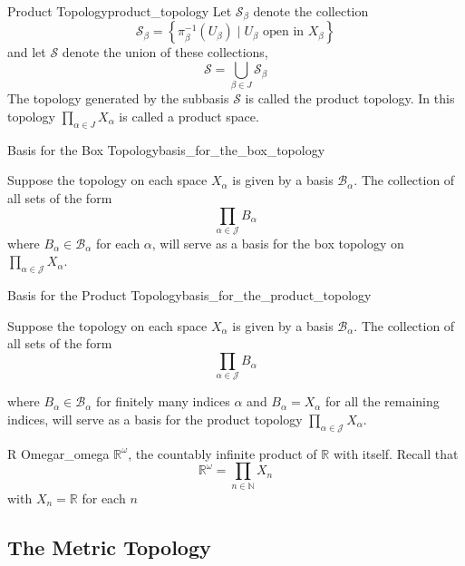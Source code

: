 \begin{definition}{Product Topology}{product_topology}
    Let $\mathcal{S}_{\beta}$ denote the collection
    \[
    \mathcal{ S } _{\beta}=\left\{\pi_{\beta}^{-1}\left(U_{\beta}\right) \mid U_{\beta} \text { open in } X_{\beta}\right\}
    \]
    and let $\mathcal{ S } $ denote the union of these collections,
    \[
    \mathcal{S}=\bigcup_{\beta \in J} \mathcal{S}_{\beta}
    \]
    The topology generated by the subbasis $\mathcal{ S } $ is called the product topology. In this topology $\prod_{\alpha \in J} X_{\alpha}$ is called a product space.
\end{definition}




\begin{theorem}{Basis for the Box Topology}{basis_for_the_box_topology}

Suppose the topology on each space $X_{\alpha}$ is given by a basis $\mathcal{B}_{\alpha}$. The collection of all sets of the form
\[
\prod_{\alpha \in \mathcal{ J } } B_{\alpha}
\]
where $B_{\alpha} \in \mathcal{B}_{\alpha}$ for each $\alpha$, will serve as a basis for the box topology on $\prod_{\alpha \in \mathcal{ J } } X_{\alpha}$.
\end{theorem}

\begin{theorem}{Basis for the Product Topology}{basis_for_the_product_topology}

Suppose the topology on each space $X_{\alpha}$ is given by a basis $\mathcal{B}_{\alpha}$. The collection of all sets of the form
\[
\prod_{\alpha \in \mathcal{ J } } B_{\alpha}
\]

where $B_{\alpha} \in \mathcal{ B } _{\alpha}$ for finitely many indices $\alpha$ and $B_{\alpha}=X_{\alpha}$ for all the remaining indices, will serve as a basis for the product topology $\prod_{\alpha \in \mathcal{ J } } X_{\alpha}$.
\end{theorem}

\begin{definition}{R Omega}{r_omega}
$\mathbb{R}^{\omega}$, the countably infinite product of $\mathbb{R}$ with itself. Recall that
\[
    \mathbb{R}^{\omega}=\prod_{n \in \mathbb{N}} X_{n}
\]
with $ X_{ n }  =  \mathbb{R}  $ for each $ n $ 
\end{definition}


\subsection{The Metric Topology}

